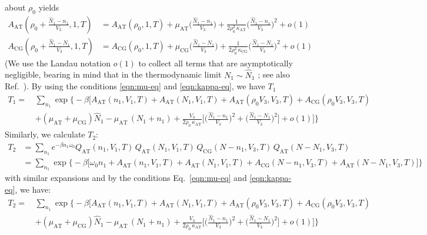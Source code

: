 \documentclass[aps,a4paper,reprint,onecolumn]{revtex4}
\newcommand{\AT}{{\textrm{{AT}}}}
\newcommand{\CG}{{\textrm{CG}}}
\begin{document}
about $\rho_0$ yields
\begin{align}
  A_{\AT}(\rho_0 + \frac{\hat N_1 - n_1}{V_3},1,T)
  &= A_{\AT}(\rho_0,1,T)
  +\mu_{\AT}
  \Big(
  \frac{\hat N_1 - n_1}{V_3}
  \Big)
  +
  \frac1{2\rho_0^2\,\kappa_{\AT}}
  \Big(
  \frac{\hat N_1 - n_1}{V_3}
  \Big)^2
  + o(1) \\
  A_{\CG}(\rho_0 + \frac{\hat N_1 - N_1}{V_3},1,T)
  &= A_{\CG}(\rho_0,1,T)
  +\mu_{\CG}
  \Big(
  \frac{\hat N_1 - N_1}{V_3}
  \Big)
  +
  \frac1{2\rho_0^2\,\kappa_{\CG}}
  \Big(
  \frac{\hat N_1 - N_1}{V_3}
  \Big)^2
  + o(1)
\end{align}
(We use the Landau notation $o(1)$ to collect all terms that are asymptotically negligible, bearing in mind that in the thermodynamic limit $N_{1}\sim\hat{N}_{1}$ ;  see also Ref.~).
By using the conditions \eqref{eqn:mu-eq} and \eqref{eqn:kappa-eq},
we have $T_1$
\begin{align}\nonumber
  T_1
  = \,&
  \sum_{n_1}
  \exp
  \Big\{-\beta
  \Big[
  A_{\AT}(n_1,V_1,T) +
  A_{\AT}(N_1,V_1,T) +
  A_{\AT}(\rho_0V_3,V_3,T) +
  A_{\CG}(\rho_0V_3,V_3,T) \\
  \,&+(\mu_\AT + \mu_\CG)\hat N_1
  -\mu_{\AT}\,(N_1 + n_1) +
  \frac{V_3}{2\rho_0\, \kappa_{\AT}}
  \Big[
  \Big(
  \frac{\hat N_1 - n_1}{V_3}
  \Big)^2
  +
  \Big(
  \frac{\hat N_1 - N_1}{V_3}
  \Big)^2
  \Big]
  + o(1)
  \Big]
  \Big\}
\end{align}
Similarly, we calculate $T_2$:
\begin{align}\nonumber
  T_2
  &=
  \sum_{n_1}
  e^{-\beta n_1\omega_0}
  Q_{\AT}(n_1,V_1,T)\,
  Q_{\AT}(N_1,V_1,T)\,
  Q_{\CG}(N-n_1,V_3,T)\,
  Q_{\AT}(N-N_1,V_3,T) \\\nonumber
  &=
  \sum_{n_1}
  \exp
  \big\{-\beta
  \big[
  \omega_0n_1 +
  A_{\AT}(n_1,V_1,T) +
  A_{\AT}(N_1,V_1,T) +
  A_{\CG}(N-n_1,V_3,T) +
  A_{\AT}(N-N_1,V_3,T)
  \big]
  \big\}
\end{align}
with similar expansions and by the conditions Eq.~\eqref{eqn:mu-eq}
and \eqref{eqn:kappa-eq}, we have:
\begin{align}\nonumber
  T_2
  = \,&
  \sum_{n_1}
  \exp
  \Big\{-\beta
  \Big[
  A_{\AT}(n_1,V_1,T) +
  A_{\AT}(N_1,V_1,T) +
  A_{\AT}(\rho_0V_3,V_3,T) +
  A_{\CG}(\rho_0V_3,V_3,T) \\
  \,&+(\mu_\AT + \mu_\CG)\hat N_1
  -\mu_{\AT}\,(N_1 + n_1) +
  \frac{V_3}{2\rho_0\, \kappa_{\AT}}
  \Big[
  \Big(
  \frac{\hat N_1 - n_1}{V_3}
  \Big)^2
  +
  \Big(
  \frac{\hat N_1 - N_1}{V_3}
  \Big)^2
  \Big]
  + o(1)
  \Big]
  \Big\}
\end{align}
\end{document}
